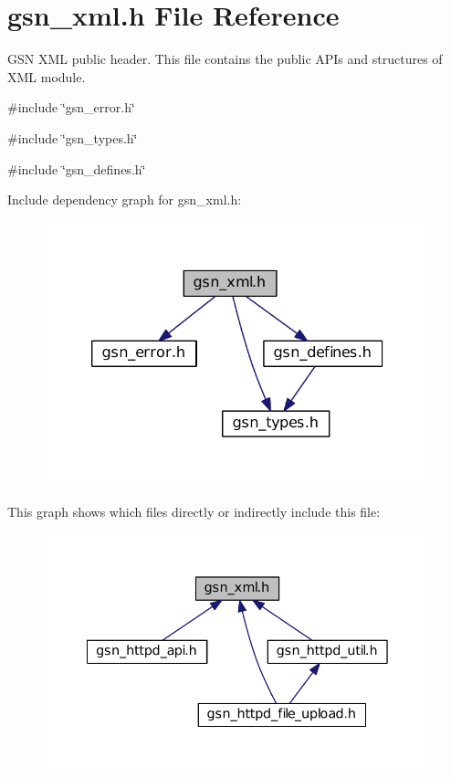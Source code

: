\hypertarget{a00616}{
\section{gsn\_\-xml.h File Reference}
\label{a00616}
}


GSN XML public header. This file contains the public APIs and structures of XML module.  


{\ttfamily \#include \char`\"{}gsn\_\-error.h\char`\"{}}\par
{\ttfamily \#include \char`\"{}gsn\_\-types.h\char`\"{}}\par
{\ttfamily \#include \char`\"{}gsn\_\-defines.h\char`\"{}}\par
Include dependency graph for gsn\_\-xml.h:
\nopagebreak
\begin{figure}[H]
\begin{center}
\leavevmode
\includegraphics[width=320pt]{a00865}
\end{center}
\end{figure}
This graph shows which files directly or indirectly include this file:
\nopagebreak
\begin{figure}[H]
\begin{center}
\leavevmode
\includegraphics[width=356pt]{a00866}
\end{center}
\end{figure}

